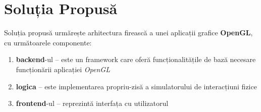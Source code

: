 \documentclass[12pt,a4paper]{report}
\newcommand{\worktype}[1]{[\textit{#1}] }
\newcommand{\dezvoltare}{\worktype{Dezvoltare de produs}}
\newcommand{\cercetare}{\worktype{Cercetare}}
\newcommand{\ambele}{\worktype{Ambele}}
\begin{document}
%
%
%
%
%
%

\chapter{Soluția Propusă}

Soluția propusă urmărește arhitectura firească a unei aplicații grafice \textbf{OpenGL}, cu următoarele componente:
\begin{enumerate}
	\item \textbf{backend}-ul -- este un framework care oferă funcționalitățile de bază necesare funcționării aplicației \textit{OpenGL}
	\item \textbf{logica} -- este implementarea propriu-zisă a simulatorului de interacțiuni fizice
	\item \textbf{frontend}-ul -- reprezintă interfața cu utilizatorul
\end{enumerate}
\end{document}
